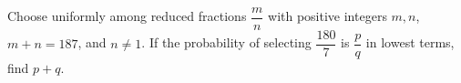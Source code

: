 Choose uniformly among reduced fractions $\dfrac{m}{n}$ with positive integers $m,n$, $m+n=187$, and $n\ne1$. If the probability of selecting $\dfrac{180}{7}$ is $\dfrac{p}{q}$ in lowest terms, find $p+q$.
